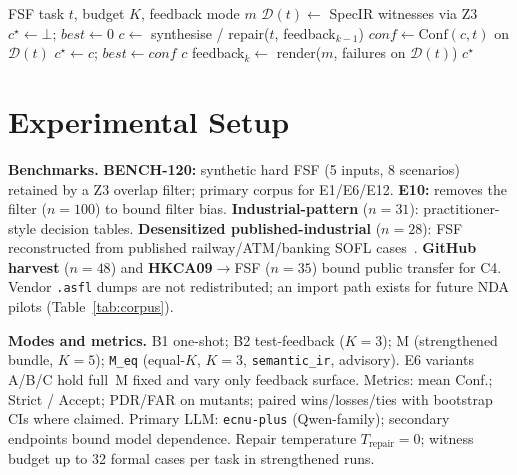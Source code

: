 \documentclass[10pt,conference]{IEEEtran}
\newcommand{\runin}[1]{\medskip\noindent\textbf{#1}\enspace}
\begin{document}
\begin{algorithm}[t]
\caption{\textsc{SgDP} repair loop (HSP-Agile instantiation)}
\label{alg:sgdp}
\begin{algorithmic}[1]
\Require FSF task $t$, budget $K$, feedback mode $m$
\State $\mathcal{D}(t)\gets$ SpecIR witnesses via Z3
\State $c^\star\gets\bot$; $\mathit{best}\gets 0$
  \State $c\gets$ synthesise / repair($t$, feedback$_{k-1}$)
  \State $\mathit{conf}\gets\mathrm{Conf}(c,t)$ on $\mathcal{D}(t)$
   $c^\star\gets c$; $\mathit{best}\gets\mathit{conf}$
  \EndIf
   \Return $c$
  \EndIf
  \State feedback$_k\gets$ render($m$, failures on $\mathcal{D}(t)$)
\EndFor
\State \Return $c^\star$ 
\end{algorithmic}
\end{algorithm}

\section{Experimental Setup}
\runin{Benchmarks.}
\textbf{BENCH-120:} synthetic hard FSF (5 inputs, 8 scenarios) retained by a Z3
overlap filter; primary corpus for E1/E6/E12.
\textbf{E10:} removes the filter ($n{=}100$) to bound filter bias.
\textbf{Industrial-pattern} ($n{=}31$): practitioner-style decision tables.
\textbf{Desensitized published-industrial} ($n{=}28$): FSF reconstructed from
published railway/ATM/banking SOFL
cases~\cite{liu1998railwaycrossing,luo2017railway,liu2004soflbook}.
\textbf{GitHub harvest} ($n{=}48$) and \textbf{HKCA09}$\rightarrow$FSF
($n{=}35$) bound public transfer for C4.
Vendor \texttt{.asfl} dumps are not redistributed; an import path exists for
future NDA pilots (Table~\ref{tab:corpus}).

\runin{Modes and metrics.}
B1 one-shot; B2 test-feedback ($K{=}3$); M (strengthened bundle, $K{=}5$);
\texttt{M\_eq} (equal-$K$, $K{=}3$, \texttt{semantic\_ir}, advisory).
E6 variants A/B/C hold full~M fixed and vary only feedback surface.
Metrics: mean Conf.; Strict / $\mathrm{Accept}$; PDR/FAR on mutants; paired
wins/losses/ties with bootstrap CIs where claimed.
Primary LLM: \texttt{ecnu-plus} (Qwen-family); secondary endpoints bound model
dependence.
Repair temperature $T_\text{repair}{=}0$; witness budget up to 32 formal cases
per task in strengthened runs.
\end{document}
